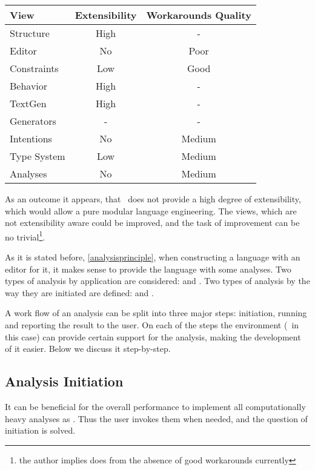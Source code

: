 \begin{center}
\begin{tabular}{l|c|c}
\textbf{View} & \textbf{Extensibility} & \textbf{Workarounds Quality} \\
\hline
Structure & High & -\\
Editor & No & Poor\\
Constraints & Low & Good\\
Behavior & High & -\\
TextGen & High & -\\
Generators & - & -\\
Intentions & No & Medium\\
Type System & Low & Medium\\
Analyses & No & Medium
\end{tabular}
\end{center}


As an outcome it appears, that \jbmps\ does not provide a high degree of extensibility, which would allow 
a pure modular language engineering. The views, which are not extensibility aware could be improved, and the
task of improvement can be no trivial\footnote{the author implies does from the absence of good workarounds currently}.


As it is stated before, \ref{analysisprinciple}, when constructing a language with an editor for it, 
it makes sense to provide the language with some analyses. Two types of analysis by application are considered:
 and . Two types of analysis by the way they are initiated are defined: 
 and .

A work flow of an analysis can be split into three major steps: initiation, running and reporting the result to the user.
On each of the steps the environment (\jbmps\ in this case) can provide certain support for the analysis, making the 
development of it easier. Below we discuss it step-by-step.

\subsection{Analysis Initiation}

It can be beneficial for the overall  performance to implement all computationally heavy analyses 
as . Thus the user invokes them when needed, and the question of initiation is solved.

